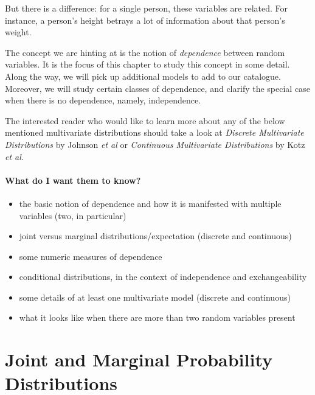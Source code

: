 \documentclass[captions=tableheading]{scrbook}
\begin{document}
But there is a difference: for a single person, these variables are related. For instance, a person's height betrays a lot of information about that person's weight.

The concept we are hinting at is the notion of \emph{dependence} between random variables. It is the focus of this chapter to study this concept in some detail. Along the way, we will pick up additional models to add to our catalogue. Moreover, we will study certain classes of dependence, and clarify the special case when there is no dependence, namely, independence.

The interested reader who would like to learn more about any of the below mentioned multivariate distributions should take a look at \emph{Discrete Multivariate Distributions} by Johnson \emph{et al}\cite{Johnson1997} or \emph{Continuous Multivariate Distributions} \cite{Kotz2000} by Kotz \emph{et al}.



\paragraph*{What do I want them to know?}

\begin{itemize}
\item the basic notion of dependence and how it is manifested with multiple variables (two, in particular)
\item joint versus marginal distributions/expectation (discrete and continuous)
\item some numeric measures of dependence
\item conditional distributions, in the context of independence and exchangeability
\item some details of at least one multivariate model (discrete and continuous)
\item what it looks like when there are more than two random variables present
\end{itemize}
\section{Joint and Marginal Probability Distributions}
\label{sec-7-1}

\label{sec:Joint-Probability-Distributions}
\end{document}
